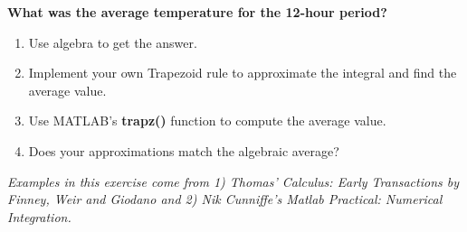 \documentclass[10pt,fleqn]{article}
\begin{document}
\textbf{What was the average temperature for the 12-hour period?}
\begin{enumerate}
	\item Use algebra to get the answer.
	\item Implement your own Trapezoid rule to approximate the integral and find the average value.
	\item Use MATLAB's \textbf{trapz()} function to compute the average value.
	\item Does your approximations match the algebraic average?
\end{enumerate}


\vfill

\textit{Examples in this exercise come from 1) Thomas' Calculus: Early Transactions by Finney, Weir and Giodano and 2) Nik Cunniffe's Matlab Practical: Numerical Integration.}
\end{document}
